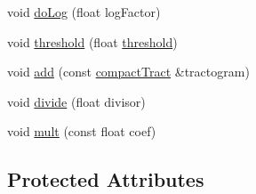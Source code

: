 \begin{DoxyCompactItemize}
void \hyperlink{classcompactTract_abf9c31679d523983b6542fce7da0f1d8}{do\-Log} (float log\-Factor)
\item 
void \hyperlink{classcompactTract_a3ab03b798e664ce5fb603f95770cafd2}{threshold} (float \hyperlink{classcompactTract_a3ab03b798e664ce5fb603f95770cafd2}{threshold})
\item 
void \hyperlink{classcompactTract_a40097474b722b556dccbf1db2bf69125}{add} (const \hyperlink{classcompactTract}{compact\-Tract} \&tractogram)
\item 
void \hyperlink{classcompactTract_a722158fc579f23dc3e5ee1714b39b472}{divide} (float divisor)
\item 
void \hyperlink{classcompactTract_a74d09e9163d2d24df2f8bbfd771190dc}{mult} (const float coef)
\end{DoxyCompactItemize}
\subsection*{\-Protected \-Attributes}
